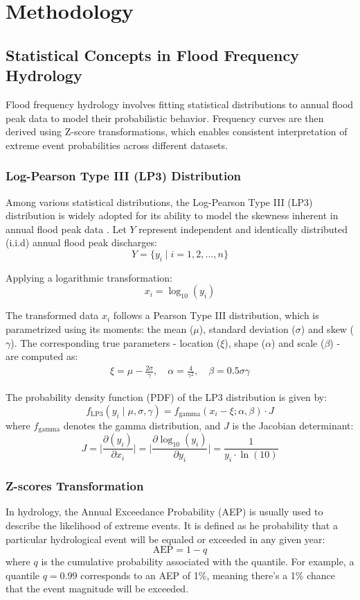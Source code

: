 \section{Methodology}
\subsection{Statistical Concepts in Flood Frequency Hydrology}
Flood frequency hydrology involves fitting statistical distributions to annual flood peak data to model their probabilistic behavior. Frequency curves are then derived using Z-score transformations, which enables consistent interpretation of extreme event probabilities across different datasets. 

\subsubsection{Log-Pearson Type III (LP3) Distribution}
Among various statistical distributions, the Log-Pearson Type III (LP3) distribution is widely adopted for its ability to model the skewness inherent in annual flood peak data \citep{Singh_1998}. Let $Y$ represent independent and identically distributed (i.i.d) annual flood peak discharges:
$$Y = \{y_i \mid i = 1, 2, ..., n\}$$
 
Applying a logarithmic transformation:
$$x_i = \log_{10} (y_i)$$

The transformed data $x_i$ follows a Pearson Type III distribution, which is parametrized using its moments: the mean ($\mu$), standard deviation ($\sigma$) and skew ($\gamma$). The corresponding true parameters - location ($\xi$), shape ($\alpha$) and scale ($\beta$) - are computed as: 
\begin{align*}
    \xi = \mu - \frac{2 \sigma}{\gamma}, \quad \alpha = \frac{4}{\gamma^2}, \quad \beta = 0.5 \sigma \gamma 
\end{align*}

The probability density function (PDF) of the LP3 distribution is given by:
$$f_{\text{LP3}}(y_i \mid \mu, \sigma, \gamma) = f_{\text{gamma}} (x_i - \xi; \alpha, \beta) \cdot J$$
where $f_{\text{gamma}}$ denotes the gamma distribution, and $J$ is the Jacobian determinant:
$$J = \bigg| \frac{\partial (y_i)}{\partial x_i} \bigg|  = \bigg| \frac{\partial \log_{10} (y_i)}{\partial y_i} \bigg| = \frac{1}{y_i \cdot \ln(10)}$$

\subsubsection{Z-scores Transformation}
\label{sec:z_scores}
In hydrology, the Annual Exceedance Probability (AEP) is usually used to describe the likelihood of extreme events. It is defined as he probability that a particular hydrological event will be equaled or exceeded in any given year:
$$\text{AEP} = 1 -q$$
where $q$ is the cumulative probability associated with the quantile. For example, a quantile $q=0.99$ corresponds to an AEP of 1\%, meaning there’s a 1\% chance that the event magnitude will be exceeded.

